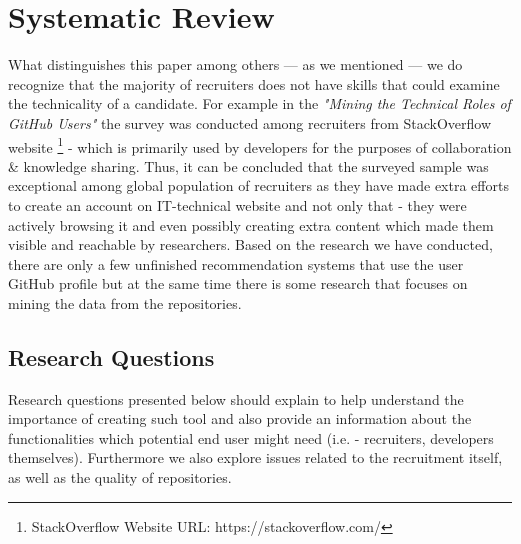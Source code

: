 \section{Systematic Review}

What distinguishes this paper among others — as we mentioned — we do recognize that the majority of recruiters does not have skills that could examine the technicality of a candidate. For example in the \emph{"Mining the Technical Roles of GitHub Users"} the survey was conducted among recruiters from StackOverflow website \footnote{StackOverflow Website URL: https://stackoverflow.com/} - which is primarily used by developers for the purposes of collaboration \& knowledge sharing. Thus, it can be concluded that the surveyed sample was exceptional among global population of recruiters as they have made extra efforts to create an account on IT-technical website and not only that - they were actively browsing it and even possibly creating extra content which made them visible and reachable by researchers. Based on the research we have conducted, there are only a few unfinished recommendation systems that use the user GitHub profile but at the same time there is some research that focuses on mining the data from the repositories.

\subsection{Research Questions}
Research questions presented below should explain to help understand the importance of creating such tool and also provide an information about the functionalities which potential end user might need (i.e. - recruiters, developers themselves). Furthermore we also explore issues related to the recruitment itself, as well as the quality of repositories.

